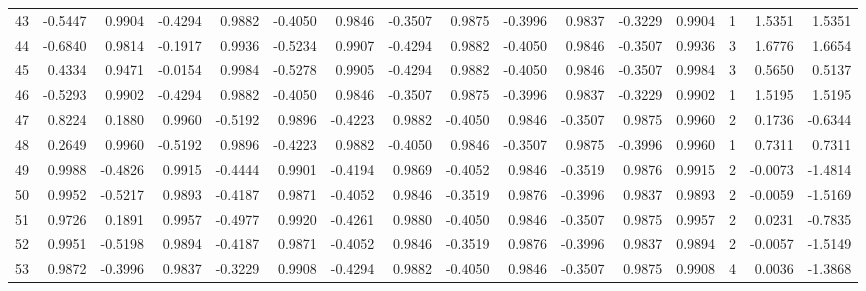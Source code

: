 \begin{tabular}{lrrrrrrrrrrrrrrr}
43  &     -0.5447 &  0.9904 & -0.4294 &  0.9882 & -0.4050 &  0.9846 & -0.3507 &  0.9875 & -0.3996 &  0.9837 &  -0.3229 &     0.9904 &      1 &                    1.5351 &                     1.5351 \\
44  &     -0.6840 &  0.9814 & -0.1917 &  0.9936 & -0.5234 &  0.9907 & -0.4294 &  0.9882 & -0.4050 &  0.9846 &  -0.3507 &     0.9936 &      3 &                    1.6776 &                     1.6654 \\
45  &      0.4334 &  0.9471 & -0.0154 &  0.9984 & -0.5278 &  0.9905 & -0.4294 &  0.9882 & -0.4050 &  0.9846 &  -0.3507 &     0.9984 &      3 &                    0.5650 &                     0.5137 \\
46  &     -0.5293 &  0.9902 & -0.4294 &  0.9882 & -0.4050 &  0.9846 & -0.3507 &  0.9875 & -0.3996 &  0.9837 &  -0.3229 &     0.9902 &      1 &                    1.5195 &                     1.5195 \\
47  &      0.8224 &  0.1880 &  0.9960 & -0.5192 &  0.9896 & -0.4223 &  0.9882 & -0.4050 &  0.9846 & -0.3507 &   0.9875 &     0.9960 &      2 &                    0.1736 &                    -0.6344 \\
48  &      0.2649 &  0.9960 & -0.5192 &  0.9896 & -0.4223 &  0.9882 & -0.4050 &  0.9846 & -0.3507 &  0.9875 &  -0.3996 &     0.9960 &      1 &                    0.7311 &                     0.7311 \\
49  &      0.9988 & -0.4826 &  0.9915 & -0.4444 &  0.9901 & -0.4194 &  0.9869 & -0.4052 &  0.9846 & -0.3519 &   0.9876 &     0.9915 &      2 &                   -0.0073 &                    -1.4814 \\
50  &      0.9952 & -0.5217 &  0.9893 & -0.4187 &  0.9871 & -0.4052 &  0.9846 & -0.3519 &  0.9876 & -0.3996 &   0.9837 &     0.9893 &      2 &                   -0.0059 &                    -1.5169 \\
51  &      0.9726 &  0.1891 &  0.9957 & -0.4977 &  0.9920 & -0.4261 &  0.9880 & -0.4050 &  0.9846 & -0.3507 &   0.9875 &     0.9957 &      2 &                    0.0231 &                    -0.7835 \\
52  &      0.9951 & -0.5198 &  0.9894 & -0.4187 &  0.9871 & -0.4052 &  0.9846 & -0.3519 &  0.9876 & -0.3996 &   0.9837 &     0.9894 &      2 &                   -0.0057 &                    -1.5149 \\
53  &      0.9872 & -0.3996 &  0.9837 & -0.3229 &  0.9908 & -0.4294 &  0.9882 & -0.4050 &  0.9846 & -0.3507 &   0.9875 &     0.9908 &      4 &                    0.0036 &                    -1.3868 \\

\end{tabular}

